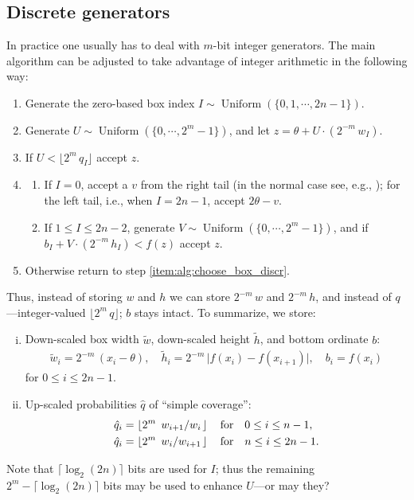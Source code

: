 \documentclass{article}
\newcommand{\slfrac}[2]{\left. #1 \middle/ #2 \right.}
\theoremstyle{definition} %
\DeclareMathOperator{\DUnif}{\mathrm{Uniform}} %
\newcommand{\nolabel}[1]{}
\newcommand{\Mode}{\theta}
\begin{document}
\subsection{Discrete generators}
    In practice one usually has to deal with $m$-bit integer generators.
    The main algorithm can be adjusted to take advantage of integer arithmetic in the following way:
    \begin{enumerate}
        \item \label{item:alg:choose_box_discr} Generate the zero-based box index $I \sim \DUnif (\{ 0, 1, \cdots , 2 n - 1 \})$.

        \item \nolabel{item:alg:horizontal} Generate $U \sim \DUnif (\{ 0, \cdots , 2^m - 1 \})$, and let $z = \Mode + U \cdot (2^{-m}\, w_I)$.

        \item \nolabel{item:alg:inside_simple} If $U < \lfloor 2^m \, q_I \rfloor$ accept $z$.

        \item %
            \begin{enumerate}
                \item \nolabel{item:alg:tail_box} If $I = 0$, accept a $v$ from the right tail (in the normal case see, e.g., \citet{Marsaglia:64}); for the left tail, i.e., when $I = 2 n - 1$, accept $2 \Mode - v$.

                \item If $1 \le I \le 2 n - 2$, generate $V \sim \DUnif (\{ 0, \cdots , 2^m - 1 \})$, and if $b_I + V \cdot (2^{-m}\, h_I) < f(z)$ accept $z$.
            \end{enumerate}

        \item Otherwise return to step \ref{item:alg:choose_box_discr}.
    \end{enumerate}
    Thus, instead of storing $w$ and $h$ we can store $2^{-m}\, w$ and $2^{-m}\, h$, and instead of $q$---integer-valued $\lfloor 2^m \, q \rfloor$; $b$ stays intact. To summarize, we store:
    \begin{enumerate}[(i)]
        \item Down-scaled box width $\tilde{w}$, down-scaled height $\tilde{h}$, and bottom ordinate $b$:
            \begin{align*}
                \tilde{w}_i = 2^{-m}\, (x_i - \Mode ), \quad \tilde{h}_i = 2^{-m}\, \big| f(x_i) - f(x_{i + 1}) \big|, \quad b_i = f(x_i)
            \end{align*}
            for $0 \le i \le 2 n - 1$.

        \item Up-scaled probabilities $\hat{q}$ of ``simple coverage'':
            \begin{align*}
                \hat{q}_i &= \left\lfloor 2^m \, \slfrac{w_{i + 1}}{w_{i}} \right\rfloor \quad \text{for} \quad 0 \le i \le n - 1, \\
                \hat{q}_i &= \left\lfloor 2^m \, \slfrac{w_{i}}{w_{i + 1}} \right\rfloor \quad \text{for} \quad n \le i \le 2 n - 1.
            \end{align*}
    \end{enumerate}
    Note that $\lceil \log _2 (2 n) \rceil$ bits are used for $I$; thus the remaining $2^{m} - \lceil \log _2 (2 n) \rceil$ bits may be used to enhance $U$---or may they?




\end{document}
